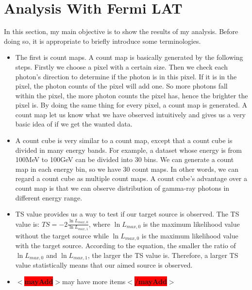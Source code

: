 \documentclass[12pt]{report}
\newcommand{\mayAdd}[1]{
  $<$\colorbox{red}{\textbf{mayAdd}}$>$#1$<$\colorbox{red}{\textbf{/mayAdd}}$>$
}
\begin{document}
        \section{Analysis With Fermi LAT}
        In this section, my main objective is to show the results of my analysis. Before doing so, it is 
        appropriate to briefly introduce some terminologies. 
        \begin{itemize}
          \item The first is count maps. A count map is basically generated by the following steps. Firstly we choose a 
            pixel with a certain size. Then we check each photon's direction to determine if the photon is in this 
            pixel. If it is in the pixel, the photon counts of the pixel will add one. So more photons fall within 
            the pixel, the more photon counts the pixel has, hence the brighter the pixel is. By doing the same thing 
            for every pixel, a count map is generated. A count map let us know what we have observed intuitively and 
            gives us a very basic idea of if we get the wanted data. 
          \item A count cube is very similar to a count map, except that a count cube is divided in many energy
            bands. For example, a dataset whose energy is from 100MeV to 100GeV can be divided into 30 bins. We can
            generate a count map in each energy bin, so we have 30 count maps. In other words, we can regard a 
            count cube as multiple count maps. A count cube's advantage over a count map is that we can 
            observe distribution of gamma-ray photons in different energy range. 
          \item TS value provides us a way to test if our target source is observed. The TS value is: 
            $TS = -2 \frac{\ln{L_{max, 0}}}{\ln{L_{max, 1}}}$, where $\ln{L_{max, 0}}$ is the maximum likelihood value 
            without the target source while $\ln{L_{max, 0}}$ is the maximum likelihood value with the target source.
            According to the equation, the smaller the ratio of $\ln{L_{max, 0}}$ and $\ln{L_{max, 1}}$, the larger
            the TS value is. Therefore, a larger TS value statistically means that our aimed source is observed. 
          \item \mayAdd{may have more items}
        \end{itemize}
\end{document}
